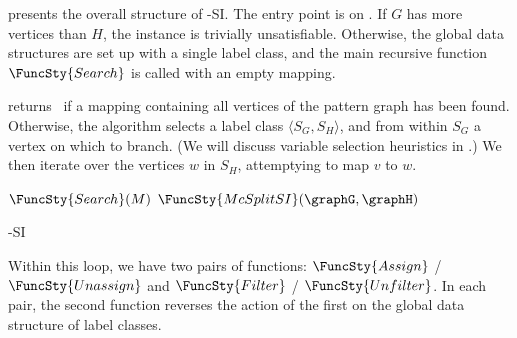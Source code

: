  presents the overall structure of \McSplit-SI.  The entry point is
on .  If $G$ has more vertices than $H$, the instance is trivially
unsatisfiable. Otherwise, the global data structures are set up with
a single label class, and the main recursive function $\FuncSty{Search}$ is called with
an empty mapping.

 returns \boolT\ if a mapping containing all
vertices of the pattern graph has been found.  Otherwise, the algorithm selects
a label class $\langle S_G, S_H \rangle$, and from within $S_G$ a vertex on
which to branch.  (We will discuss variable selection heuristics in
.) We then iterate over the vertices $w$ in $S_H$,
attemptying to map $v$ to $w$.

\begin{algorithm}[htb]
\AlgorithmFontSize
\DontPrintSemicolon
\nl $\FuncSty{Search}(M)$ \;
\nl {}
\;
\nl $\FuncSty{McSplitSI}(\graphG,\graphH)$ \label{McSplitSIFun} \;
\nl {}
\caption{\McSplit-SI}
\label{McSplitSIAlg}
\end{algorithm}

Within this loop, we have two pairs of functions:
$\FuncSty{Assign}$ / $\FuncSty{Unassign}$
and
$\FuncSty{Filter}$ / $\FuncSty{Unfilter}$.  In each pair, the
second function reverses the action of the first on the global
data structure of label classes.

